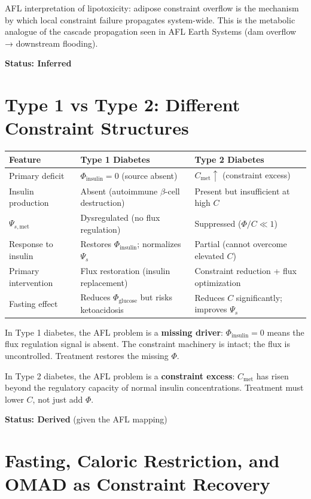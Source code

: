 \documentclass[11pt]{article}
\begin{document}
AFL interpretation of lipotoxicity: adipose constraint overflow is the mechanism by which local constraint failure propagates system-wide. This is the metabolic analogue of the cascade propagation seen in AFL Earth Systems (dam overflow → downstream flooding).

\textbf{Status: Inferred}

\section{Type 1 vs Type 2: Different Constraint Structures}

\begin{center}
\begin{tabular}{lll}
\toprule
Feature & Type 1 Diabetes & Type 2 Diabetes \\
\midrule
Primary deficit & $\Phi_{\mathrm{insulin}} = 0$ (source absent) & $C_{\mathrm{met}} \uparrow$ (constraint excess) \\
Insulin production & Absent (autoimmune $\beta$-cell destruction) & Present but insufficient at high $C$ \\
$\Psi_{s,\mathrm{met}}$ & Dysregulated (no flux regulation) & Suppressed ($\Phi/C \ll 1$) \\
Response to insulin & Restores $\Phi_{\mathrm{insulin}}$; normalizes $\Psi_s$ & Partial (cannot overcome elevated $C$) \\
Primary intervention & Flux restoration (insulin replacement) & Constraint reduction + flux optimization \\
Fasting effect & Reduces $\Phi_{\mathrm{glucose}}$ but risks ketoacidosis & Reduces $C$ significantly; improves $\Psi_s$ \\
\bottomrule
\end{tabular}
\end{center}

In Type 1 diabetes, the AFL problem is a \textbf{missing driver}: $\Phi_{\mathrm{insulin}} = 0$ means the flux regulation signal is absent. The constraint machinery is intact; the flux is uncontrolled. Treatment restores the missing $\Phi$.

In Type 2 diabetes, the AFL problem is a \textbf{constraint excess}: $C_{\mathrm{met}}$ has risen beyond the regulatory capacity of normal insulin concentrations. Treatment must lower $C$, not just add $\Phi$.

\textbf{Status: Derived} (given the AFL mapping)

\section{Fasting, Caloric Restriction, and OMAD as Constraint Recovery}
\end{document}
